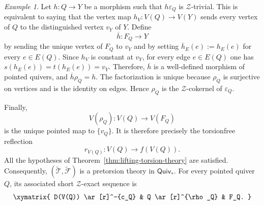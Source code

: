 \documentclass[a4paper,10pt,reqno]{amsart}
\theoremstyle{definition}
\theoremstyle{remark}
\newtheorem{example}[theorem]{Example}
\newcommand{\Quiv}{\mathsf{Quiv}}
\newcommand{\Cal}[1]{\mathcal{#1}}
\begin{document}
\begin{example}
Let $h\colon Q\to Y$ be a morphism such that $h\varepsilon_Q$ is $\Cal Z$-trivial. This is
equivalent to saying that the vertex map $h_V\colon V(Q)\to V(Y)$ sends every vertex of $Q$ to the distinguished vertex $v_Y$ of $Y$.
Define
$$
\overline h\colon F_Q\to Y
$$
by sending the unique vertex of $F_Q$ to $v_Y$ and by setting $\overline h_E(e):=h_E(e)$ for every $e\in E(Q)$. Since $h_V$ is constant at $v_Y$, for every edge $e\in E(Q)$ one has $s(h_E(e))=t(h_E(e))=v_Y$.
Therefore, $\overline h$ is a well-defined morphism of pointed quivers, and $\overline h\rho_Q=h$.
The factorization is unique because $\rho_Q$ is surjective on vertices and is the identity on edges. Hence $\rho_Q$ is the $\Cal Z$-cokernel of $\varepsilon_Q$.

Finally,
$$
V(\rho_Q)\colon V(Q)\to V(F_Q)
$$
is the unique pointed map to $\{v_Q\}$. It is therefore precisely the torsionfree reflection
$$
r_{V(Q)}\colon V(Q)\to f(V(Q)).
$$
All the hypotheses of Theorem~\ref{thm:lifting-torsion-theory} are
satisfied. Consequently, $(\widetilde{\Cal T},\widetilde{\Cal F})$ is a pretorsion theory in $\Quiv_*$. For every pointed quiver $Q$, its associated short $\Cal Z$-exact sequence is
$$
\xymatrix{
D(V(Q)) \ar[r]^-{c_Q} & Q \ar[r]^{\rho_Q} & F_Q.
}
$$
\end{example}
\end{document}
